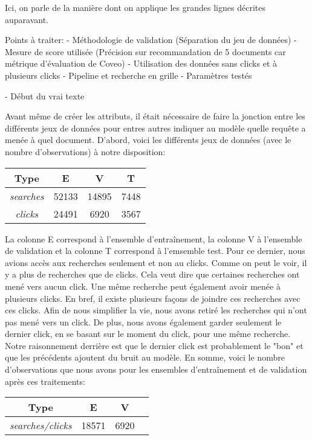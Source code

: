 Ici, on parle de la manière dont on applique les grandes lignes décrites auparavant.

Points à traiter:
	- Méthodologie de validation (Séparation du jeu de données)
	- Mesure de score utilisée (Précision sur recommandation de 5 documents car métrique d'évaluation de Coveo)
	- Utilisation des données sans clicks et à plusieurs clicks
	- Pipeline et recherche en grille
	- Paramètres testés
	
	
- Début du vrai texte

Avant même de créer les attributs, il était nécessaire de faire la jonction entre les différents jeux de données pour entres autres indiquer au modèle quelle requête a menée à quel document. D'abord, voici les différents jeux de données (avec le nombre d'observations) à notre disposition:

\begin{center}
  \begin{tabular}{ |c|c|c|c| } 
     \hline
     Type & E & V & T \\
     \hline
     \hline
     \textit{searches} & 52133 & 14895 & 7448 \\ 
     \hline
     \textit{clicks} & 24491 & 6920 & 3567 \\ 
     \hline
  \end{tabular}
\end{center}

La colonne E correspond à l'ensemble d'entraînement, la colonne V à l'ensemble de validation et la colonne T correspond à l'emsemble test. Pour ce dernier, nous avions accès aux recherches seulement et non au clicks. Comme on peut le voir, il y a plus de recherches que de clicks. Cela veut dire que certaines recherches ont mené vers aucun click. Une même recherche peut également avoir menée à plusieurs clicks. En bref, il existe plusieurs façons de joindre ces recherches avec ces clicks. Afin de nous simplifier la vie, nous avons retiré les recherches qui n'ont pas mené vers un click. De plus, nous avons également garder seulement le dernier click, en se basant sur le moment du click, pour une même recherche. Notre raisonnement derrière est que le dernier click est probablement le "bon" et que les précédents ajoutent du bruit au modèle. En somme, voici le nombre d'observations que nous avons pour les ensembles d'entraînement et de validation après ces traitements:

\begin{center}
  \begin{tabular}{ |c|c|c|c| } 
     \hline
     Type & E & V \\
     \hline
     \hline
     \textit{searches/clicks} & 18571 & 6920 \\ 
     \hline
  \end{tabular}
\end{center}

